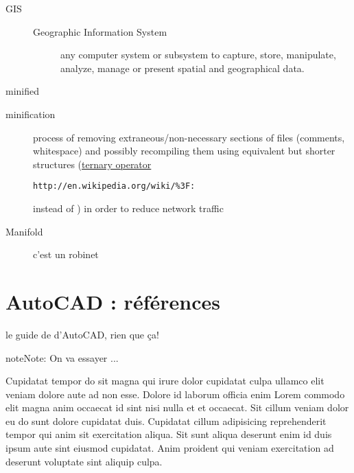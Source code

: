 \documentclass[a4paper,10pt,french]{sphinxmanual}
\begin{document}
\begin{description}
\item[{GIS}] \leavevmode{}\label{\detokenize{docs/refs/autocad-gloss:term-gis}}\begin{description}
\item[{Geographic Information System}] \leavevmode
any computer system or subsystem to capture, store, manipulate, analyze, manage or present spatial and geographical data.

\end{description}

\item[{minified}] \leavevmode{}\label{\detokenize{docs/refs/autocad-gloss:term-minified}}\item[{minification}] \leavevmode{}\label{\detokenize{docs/refs/autocad-gloss:term-minification}}
process of removing extraneous/non-necessary sections of files (comments, whitespace) and possibly recompiling them using equivalent but shorter structures (\href{http://en.wikipedia.org/wiki/\%3F:}{ternary operator}%
\begin{footnote}[4]\sphinxAtStartFootnote
\nolinkurl{http://en.wikipedia.org/wiki/\%3F:}
%
\end{footnote} instead of ) in order to reduce network traffic

\item[{Manifold}] \leavevmode{}\label{\detokenize{docs/refs/autocad-gloss:term-manifold}}
c'est un robinet

\end{description}


\chapter{AutoCAD : références}
\label{\detokenize{docs/refs/autocad-refs:autocad-refs}}\label{\detokenize{docs/refs/autocad-refs::doc}}\label{\detokenize{docs/refs/autocad-refs:autodesk}}\label{\detokenize{docs/refs/autocad-refs:autocad-references}}
le guide de  d'AutoCAD, rien que ça!

\begin{sphinxadmonition}{note}{Note:}
On va essayer ...
\end{sphinxadmonition}

Cupidatat tempor do sit magna qui irure dolor cupidatat culpa ullamco elit veniam dolore aute ad non esse. Dolore id laborum officia enim Lorem commodo elit magna anim occaecat id sint nisi nulla et et occaecat. Sit cillum veniam dolor eu do sunt dolore cupidatat duis. Cupidatat cillum adipisicing reprehenderit tempor qui anim sit exercitation aliqua. Sit sunt aliqua deserunt enim id duis ipsum aute sint eiusmod cupidatat. Anim proident qui veniam exercitation ad deserunt voluptate sint aliquip culpa.
\end{document}
